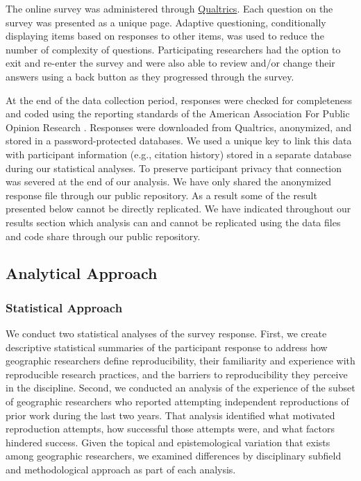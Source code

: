 \documentclass[]{interact}
\theoremstyle{plain}%
\theoremstyle{definition}
\theoremstyle{remark}
\begin{document}
The online survey was administered through \href{https://www.qualtrics.com/}{Qualtrics}. 
Each question on the survey was presented as a unique page. 
Adaptive questioning, conditionally displaying items based on responses to other items, was used to reduce the number of complexity of questions.
Participating researchers had the option to exit and re-enter the survey and were also able to review and/or change their answers using a back button as they progressed through the survey.

At the end of the data collection period, responses were checked for completeness and coded using the reporting standards of the American Association For Public Opinion Research \citep{aaporstandards}.
Responses were downloaded from Qualtrics, anonymized, and stored in a password-protected databases.
We used a unique key to link this data with participant information (e.g., citation history) stored in a separate database during our statistical analyses. 
To preserve participant privacy that connection was severed at the end of our analysis.
We have only shared the anonymized response file through our public repository. 
As a result some of the result presented below cannot be directly replicated. 
We have indicated throughout our results section which analysis can and cannot be replicated using the data files and code share through our public repository. 

\subsection*{Analytical Approach}

\subsubsection*{Statistical Approach}
We conduct two statistical analyses of the survey response.
First, we create descriptive statistical summaries of the participant response to address how geographic researchers define reproducibility, their familiarity and experience with reproducible research practices, and the barriers to reproducibility they perceive in the discipline.
Second, we conducted an analysis of the experience of the subset of geographic researchers who reported attempting independent reproductions of prior work during the last two years.
That analysis identified what motivated reproduction attempts, how successful those attempts were, and what factors hindered success.
Given the topical and epistemological variation that exists among geographic researchers, we examined differences by disciplinary subfield and methodological approach as part of each analysis.
\end{document}
